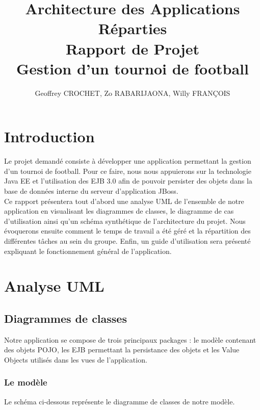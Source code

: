 \documentclass[10pt]{report}
\title{\textbf{Architecture des Applications Réparties\\ Rapport de Projet\\ Gestion d'un tournoi de football}}
\author{Geoffrey CROCHET, Zo RABARIJAONA, Willy FRANÇOIS}
\begin{document}
\maketitle


\newpage

\tableofcontents


\newpage
\chapter*{Introduction}


Le projet demandé consiste à développer une application permettant la gestion d'un tournoi de football. Pour ce faire, nous nous appuierons sur la technologie Java EE et l'utilisation des EJB 3.0 afin de pouvoir persister des objets dans la base de données interne du serveur d'application JBoss.
\\

Ce rapport présentera tout d'abord une analyse UML de l'ensemble de notre application en visualisant les diagrammes de classes, le diagramme de cas d'utilisation ainsi qu'un schéma synthétique de l'architecture du projet. Nous évoquerons ensuite comment le temps de travail a été géré et la répartition des différentes tâches au sein du groupe. Enfin, un guide d'utilisation sera présenté expliquant le fonctionnement général de l'application.

\chapter{Analyse UML}
\section{Diagrammes de classes} 

Notre application se compose de trois principaux packages : le modèle contenant des objets POJO, les EJB permettant la persistance des objets et les Value Objects utilisés dans les vues de l'application.


\subsection{Le modèle}

Le schéma ci-dessous représente le diagramme de classes de notre modèle.
\end{document}
